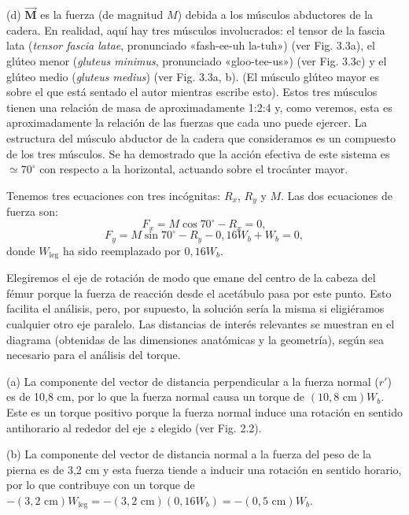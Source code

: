 \documentclass[12pt]{book}
\begin{document}
(d) $\vec{\mathbf{M}}$ es la fuerza (de magnitud $M$) debida a los músculos abductores de la cadera. En realidad, aquí hay tres músculos involucrados: el tensor de la fascia lata (\textit{tensor fascia latae}, pronunciado «fash-ee-uh la-tuh») (ver Fig. 3.3a), el glúteo menor (\textit{gluteus minimus}, pronunciado «gloo-tee-us») (ver Fig. 3.3c) y el glúteo medio (\textit{gluteus medius}) (ver Fig. 3.3a, b). (El músculo glúteo mayor es sobre el que está sentado el autor mientras escribe esto). Estos tres músculos tienen una relación de masa de aproximadamente 1:2:4 y, como veremos, esta es aproximadamente la relación de las fuerzas que cada uno puede ejercer. La estructura del músculo abductor de la cadera que consideramos es un compuesto de los tres músculos. Se ha demostrado que la acción efectiva de este sistema es $\simeq 70^\circ$ con respecto a la horizontal, actuando sobre el trocánter mayor.

Tenemos tres ecuaciones con tres incógnitas: $R_x$, $R_y$ y $M$. Las dos ecuaciones de fuerza son:
\begin{equation}
F_x = M \cos 70^\circ - R_x = 0,
\label{eq:2.25}
\end{equation}
\begin{equation}
F_y = M \sin 70^\circ - R_y - 0,16 W_b + W_b = 0,
\label{eq:2.26}
\end{equation}
donde $W_{\text{leg}}$ ha sido reemplazado por $0,16 W_b$.

Elegiremos el eje de rotación de modo que emane del centro de la cabeza del fémur porque la fuerza de reacción desde el acetábulo pasa por este punto. Esto facilita el análisis, pero, por supuesto, la solución sería la misma si eligiéramos cualquier otro eje paralelo. Las distancias de interés relevantes se muestran en el diagrama (obtenidas de las dimensiones anatómicas y la geometría), según sea necesario para el análisis del torque.

(a) La componente del vector de distancia perpendicular a la fuerza normal ($r'$) es de 10,8 cm, por lo que la fuerza normal causa un torque de $(10,8\text{ cm})W_b$. Este es un torque positivo porque la fuerza normal induce una rotación en sentido antihorario al rededor del eje $z$ elegido (ver Fig. 2.2).

(b) La componente del vector de distancia normal a la fuerza del peso de la pierna es de 3,2 cm y esta fuerza tiende a inducir una rotación en sentido horario, por lo que contribuye con un torque de $-(3,2\text{ cm})W_{\text{leg}} = -(3,2\text{ cm})(0,16 W_b) = -(0,5\text{ cm})W_b$.
\end{document}
